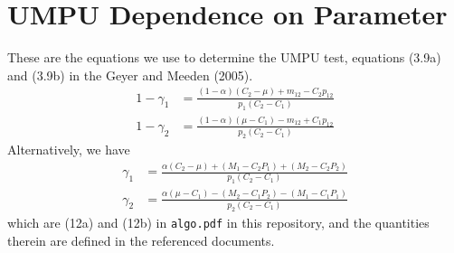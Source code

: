 \documentclass[11pt]{article}
\let\code=\texttt
\begin{document}
\section{UMPU Dependence on Parameter}

These are the equations we use to determine the UMPU test,
equations (3.9a) and (3.9b) in the Geyer and Meeden (2005).
\begin{equation} \label{eq:one-minus-gamma}
\begin{split}
   1 - \gamma_1
   & =
   \frac{(1 - \alpha) (C_2 - \mu) + m_{1 2} - C_2 p_{1 2}}
   {p_1 (C_2 - C_1)}
   \\
   1 - \gamma_2
   & =
   \frac{(1 - \alpha) (\mu - C_1) - m_{1 2} + C_1 p_{1 2}}
   {p_2 (C_2 - C_1)}
\end{split}
\end{equation}
Alternatively, we have
\begin{equation} \label{eq:gamma}
\begin{split}
   \gamma_1
   & =
   \frac{\alpha (C_2 - \mu) + (M_1 - C_2 P_1) + (M_2 - C_2 P_2)}
   {p_1 (C_2 - C_1)}
   \\
   \gamma_2
   & =
   \frac{\alpha (\mu - C_1) - (M_2 - C_1 P_2) - (M_1 - C_1 P_1)}
   {p_2 (C_2 - C_1)}
\end{split}
\end{equation}
which are (12a) and (12b) in \code{algo.pdf} in this repository,
and the quantities therein are defined in the referenced documents.
%
%
%
\end{document}
